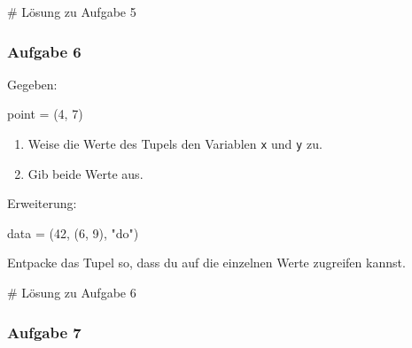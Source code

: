 \documentclass[
  11pt,
  a4paper,
  DIV=11,
  numbers=noendperiod]{scrartcl}
\newenvironment{Shaded}{\begin{snugshade}}{\end{snugshade}}
\newcommand{\CommentTok}[1]{\textcolor[rgb]{0.37,0.37,0.37}{#1}}
\newcommand{\DecValTok}[1]{\textcolor[rgb]{0.68,0.00,0.00}{#1}}
\newcommand{\NormalTok}[1]{\textcolor[rgb]{0.00,0.23,0.31}{#1}}
\newcommand{\OperatorTok}[1]{\textcolor[rgb]{0.37,0.37,0.37}{#1}}
\newcommand{\StringTok}[1]{\textcolor[rgb]{0.13,0.47,0.30}{#1}}
\providecommand{\tightlist}{%
  \setlength{\itemsep}{0pt}\setlength{\parskip}{0pt}}
\begin{document}
\begin{Shaded}
\begin{Highlighting}[numbers=left,,]
\CommentTok{\# Lösung zu Aufgabe 5}
\end{Highlighting}
\end{Shaded}

\subsubsection{Aufgabe 6}\label{aufgabe-6}

Gegeben:

\begin{Shaded}
\begin{Highlighting}[numbers=left,,]
\NormalTok{point }\OperatorTok{=}\NormalTok{ (}\DecValTok{4}\NormalTok{, }\DecValTok{7}\NormalTok{)}
\end{Highlighting}
\end{Shaded}

\begin{enumerate}
\def\labelenumi{\arabic{enumi}.}
\tightlist
\item
  Weise die Werte des Tupels den Variablen \texttt{x} und \texttt{y}
  zu.\\
\item
  Gib beide Werte aus.
\end{enumerate}

Erweiterung:

\begin{Shaded}
\begin{Highlighting}[numbers=left,,]
\NormalTok{data }\OperatorTok{=}\NormalTok{ (}\DecValTok{42}\NormalTok{, (}\DecValTok{6}\NormalTok{, }\DecValTok{9}\NormalTok{), }\StringTok{"do"}\NormalTok{)}
\end{Highlighting}
\end{Shaded}

Entpacke das Tupel so, dass du auf die einzelnen Werte zugreifen kannst.

\begin{Shaded}
\begin{Highlighting}[numbers=left,,]
\CommentTok{\# Lösung zu Aufgabe 6}
\end{Highlighting}
\end{Shaded}

\subsubsection{Aufgabe 7}\label{aufgabe-7}
\end{document}
